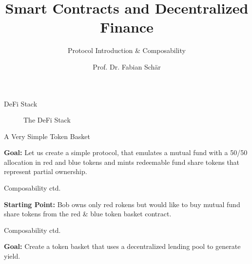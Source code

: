 \documentclass[]{beamer}
\title{Smart Contracts and Decentralized Finance}
\subtitle{Protocol Introduction \& Composability}
\author{Prof. Dr. Fabian Schär}
\institute{University of Basel}
\begin{document}
\thispagestyle{empty}
\begin{frame}[noframenumbering]
	\titlepage
\end{frame}

\begin{frame}{DeFi Stack}
	\begin{figure}
	\scalebox{0.7}{
	\begin{tikzpicture}
	
	\end{tikzpicture}
	}
	\caption{The DeFi Stack \cite{FS:21}}
\end{figure}
\end{frame}


\begin{frame}{A Very Simple Token Basket}

\textbf{Goal:} Let us create a simple protocol, that emulates a mutual fund with a 50/50 allocation in red and blue tokens and mints redeemable fund share tokens that represent partial ownership. \\ \vspace{1em}
	
\begin{figure}
	\begin{tikzpicture}
		
	\end{tikzpicture}	
\end{figure}

\end{frame}


\begin{frame}{Composability ctd.}

\textbf{Starting Point:} Bob owns only red rokens but would like to buy mutual fund share tokens from the red \& blue token basket contract. \\ \vspace{1em}

\begin{figure}
	\begin{tikzpicture}
		
	\end{tikzpicture}
\end{figure}
	
\end{frame}


\begin{frame}{Composability ctd.}

\textbf{Goal:} Create a token basket that uses a decentralized lending pool to generate yield. \\ \vspace{0.5em}
	
\begin{figure}
	\begin{tikzpicture}
		
	\end{tikzpicture}
\end{figure}

\end{frame}
\end{document}
